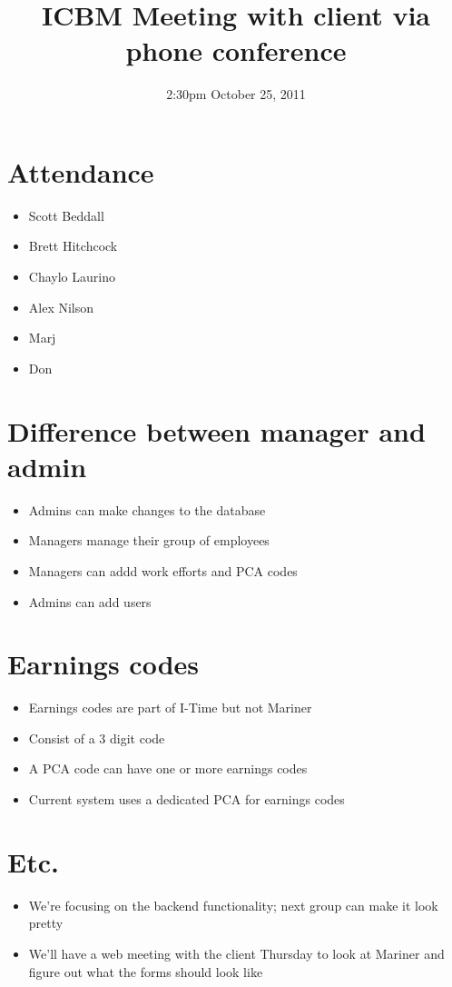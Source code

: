 \documentclass{article}
\begin{document}
\title{ICBM Meeting with client via phone conference}
\date{2:30pm October 25, 2011}
\maketitle

\section{Attendance}
\begin{itemize}
\item Scott Beddall
\item Brett Hitchcock
\item Chaylo Laurino
\item Alex Nilson
\item Marj
\item Don
\end{itemize}

\section{Difference between manager and admin}
\begin{itemize}
\item Admins can make changes to the database
\item Managers manage their group of employees
\item Managers can addd work efforts and PCA codes
\item Admins can add users
\end{itemize}

\section{Earnings codes}
\begin{itemize}
\item Earnings codes are part of I-Time but not Mariner
\item Consist of a 3 digit code
\item A PCA code can have one or more earnings codes
\item Current system uses a dedicated PCA for earnings codes
\end{itemize}

\section{Etc.}
\begin{itemize}
\item We're focusing on the backend functionality; next group can make it look pretty
\item We'll have a web meeting with the client Thursday to look at Mariner and figure out what the forms should look like
\end{itemize}
\end{document}
